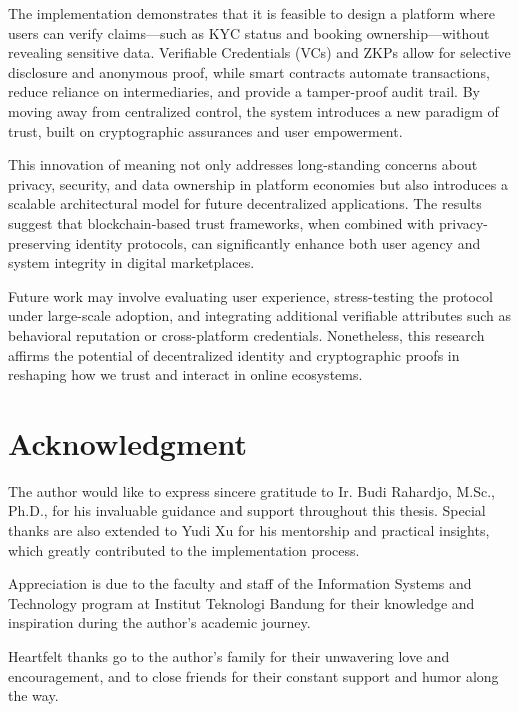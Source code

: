 \documentclass[conference]{IEEEtran}
\begin{document}
The implementation demonstrates that it is feasible to design a platform where users can verify claims—such as KYC status and booking ownership—without revealing sensitive data. Verifiable Credentials (VCs) and ZKPs allow for selective disclosure and anonymous proof, while smart contracts automate transactions, reduce reliance on intermediaries, and provide a tamper-proof audit trail. By moving away from centralized control, the system introduces a new paradigm of trust, built on cryptographic assurances and user empowerment.

This innovation of meaning not only addresses long-standing concerns about privacy, security, and data ownership in platform economies but also introduces a scalable architectural model for future decentralized applications. The results suggest that blockchain-based trust frameworks, when combined with privacy-preserving identity protocols, can significantly enhance both user agency and system integrity in digital marketplaces.

Future work may involve evaluating user experience, stress-testing the protocol under large-scale adoption, and integrating additional verifiable attributes such as behavioral reputation or cross-platform credentials. Nonetheless, this research affirms the potential of decentralized identity and cryptographic proofs in reshaping how we trust and interact in online ecosystems.

\section*{Acknowledgment}
The author would like to express sincere gratitude to Ir. Budi Rahardjo, M.Sc., Ph.D., for his invaluable guidance and support throughout this thesis. Special thanks are also extended to Yudi Xu for his mentorship and practical insights, which greatly contributed to the implementation process.

Appreciation is due to the faculty and staff of the Information Systems and Technology program at Institut Teknologi Bandung for their knowledge and inspiration during the author's academic journey.

Heartfelt thanks go to the author’s family for their unwavering love and encouragement, and to close friends for their constant support and humor along the way.
\end{document}
